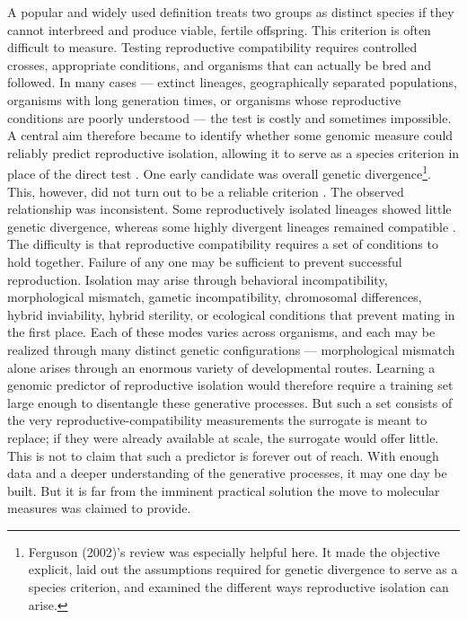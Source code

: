 \documentclass[twocolumn]{article} %
\begin{document}
A popular and widely used definition treats two groups as distinct species if they cannot interbreed and produce viable, fertile offspring. This criterion is often difficult to measure. Testing reproductive compatibility requires controlled crosses, appropriate conditions, and organisms that can actually be bred and followed. In many cases — extinct lineages, geographically separated populations, organisms with long generation times, or organisms whose reproductive conditions are poorly understood — the test is costly and sometimes impossible. A central aim therefore became to identify whether some genomic measure could reliably predict reproductive isolation, allowing it to serve as a species criterion in place of the direct test \citep[b]{manhart1992molecular}\cite{ferguson2002use}. One early candidate was overall genetic divergence\footnote{Ferguson (2002)’s review was especially helpful here. It made the objective explicit, laid out the assumptions required for genetic divergence to serve as a species criterion, and examined the different ways reproductive isolation can arise.}. This, however, did not turn out to be a reliable criterion \cite{ferguson2002use}. The observed relationship was inconsistent. Some reproductively isolated lineages showed little genetic divergence, whereas some highly divergent lineages remained compatible \cite{ferguson2002use}. The difficulty is that reproductive compatibility requires a set of conditions to hold together. Failure of any one may be sufficient to prevent successful reproduction. Isolation may arise through behavioral incompatibility, morphological mismatch, gametic incompatibility, chromosomal differences, hybrid inviability, hybrid sterility, or ecological conditions that prevent mating in the first place. Each of these modes varies across organisms, and each may be realized through many distinct genetic configurations — morphological mismatch alone arises through an enormous variety of developmental routes. Learning a genomic predictor of reproductive isolation would therefore require a training set large enough to disentangle these generative processes. But such a set consists of the very reproductive-compatibility measurements the surrogate is meant to replace; if they were already available at scale, the surrogate would offer little. This is not to claim that such a predictor is forever out of reach. With enough data and a deeper understanding of the generative processes, it may one day be built. But it is far from the imminent practical solution the move to molecular measures was claimed to provide.
\end{document}

